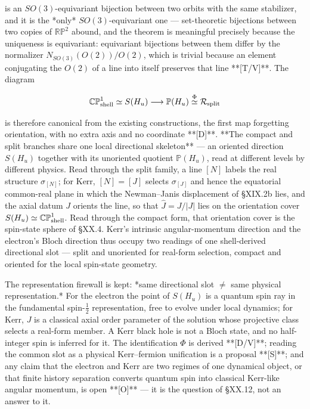is an $SO(3)$-equivariant bijection between two orbits with the same stabilizer, and it is the *only* $SO(3)$-equivariant one — set-theoretic bijections between two copies of $\mathbb{RP}^2$ abound, and the theorem is meaningful precisely because the uniqueness is equivariant: equivariant bijections between them differ by the normalizer $N_{SO(3)}(O(2))/O(2)$, which is trivial because an element conjugating the $O(2)$ of a line into itself preserves that line **[T/V]**. The diagram

$$\mathbb{CP}^1_{\rm shell}\simeq S(H_u)\longrightarrow\mathbb P(H_u)\overset{\Phi}{\simeq}\mathcal R_{\rm split}$$

is therefore canonical from the existing constructions, the first map forgetting orientation, with no extra axis and no coordinate **[D]**. **The compact and split branches share one local directional skeleton** — an oriented direction $S(H_u)$ together with its unoriented quotient $\mathbb P(H_u)$, read at different levels by different physics. Read through the split family, a line $[N]$ labels the real structure $\sigma_{[N]}$; for Kerr, $[N] = [J]$ selects $\sigma_{[J]}$ and hence the equatorial common-real plane in which the Newman–Janis displacement of §XIX.2b lies, and the axial datum $J$ orients the line, so that $\hat J = J/|J|$ lies on the orientation cover $S(H_u)\simeq\mathbb{CP}^1_{\rm shell}$. Read through the compact form, that orientation cover is the spin-state sphere of §XX.4. Kerr's intrinsic angular-momentum direction and the electron's Bloch direction thus occupy two readings of one shell-derived directional slot — split and unoriented for real-form selection, compact and oriented for the local spin-state geometry.

The representation firewall is kept: *same directional slot $\neq$ same physical representation.* For the electron the point of $S(H_u)$ is a quantum spin ray in the fundamental spin-$\tfrac12$ representation, free to evolve under local dynamics; for Kerr, $J$ is a classical axial order parameter of the solution whose projective class selects a real-form member. A Kerr black hole is not a Bloch state, and no half-integer spin is inferred for it. The identification $\Phi$ is derived **[D/V]**; reading the common slot as a physical Kerr–fermion unification is a proposal **[S]**; and any claim that the electron and Kerr are two regimes of one dynamical object, or that finite history separation converts quantum spin into classical Kerr-like angular momentum, is open **[O]** — it is the question of §XX.12, not an answer to it.

